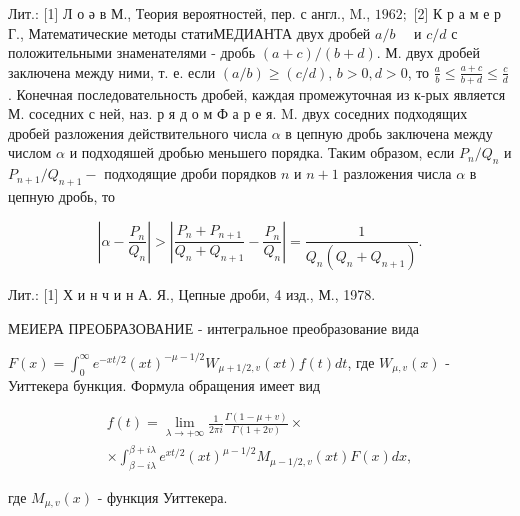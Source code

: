 \documentclass[10pt]{article}
\begin{document}
Лит.: [1] Л о ә в М., Теория вероятностей, пер. с англ., M., $1962 ;$ [2] К р а м е р Г., Математические методы статиМЕДИАНТА двух дробей $a / b \quad$ и $c / d$ с положительными знаменателями - дробь $(a+c) /(b+d)$. М. двух дробей заключена между ними, т. е. если $(a / b) \geqslant(c / d)$, $b>0, d>0$, то $\frac{a}{b} \leqslant \frac{a+c}{b+d} \leqslant \frac{c}{d}$. Конечная последовательность дробей, каждая промежуточная из к-рых является М. соседних с ней, наз. р я д о м Ф а р е я. M. двух соседних подходящих дробей разложения действительного числа $\alpha$ в цепную дробь заключена между числом $\alpha$ и подходяшей дробью меньшего порядка. Таким образом, если $P_{n} / Q_{n}$ и $P_{n+1} / Q_{n+1}-$ подходящие дроби порядков $n$ и $n+1$ разложения числа $\alpha$ в цепную дробь, то



\[

\left|\alpha-\frac{P_{n}}{Q_{n}}\right|>\left|\frac{P_{n}+P_{n+1}}{Q_{n}+Q_{n+1}}-\frac{P_{n}}{Q_{n}}\right|=\frac{1}{Q_{n}\left(Q_{n}+Q_{n+1}\right)} .

\]



Лит.: [1] Х и н ч и н А. Я., Цепные дроби, 4 изд., М., 1978.



МЕИЕРА ПРЕОБРАЗОВАНИЕ - интегральное преобразование вида



$F(x)=\int_{0}^{\infty} e^{-x t / 2}(x t)^{-\mu-1 / 2} W_{\mu+1 / 2, v}(x t) f(t) d t$, где $W_{\mu, v}(x)$ - Уиттекера бункция. Формула обращения имеет вид



\[

\begin{gathered}

f(t)=\lim _{\lambda \rightarrow+\infty} \frac{1}{2 \pi i} \frac{\Gamma(1-\mu+v)}{\Gamma(1+2 v)} \times \\

\times \int_{\beta-i \lambda}^{\beta+i \lambda} e^{x t / 2}(x t)^{\mu-1 / 2} M_{\mu-1 / 2, v}(x t) F(x) d x,

\end{gathered}

\]



где $M_{\mu, v}(x)$ - функция Уиттекера.
\end{document}
